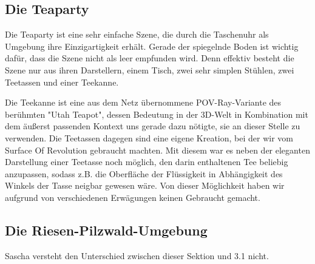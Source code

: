 \documentclass[twocolumn]{article}
\begin{document}
\subsection{Die Teaparty}
Die Teaparty ist eine sehr einfache Szene, die durch die Taschenuhr als Umgebung ihre Einzigartigkeit erhält.
Gerade der spiegelnde Boden ist wichtig dafür, dass die Szene nicht als leer empfunden wird.
Denn effektiv besteht die Szene nur aus ihren Darstellern, einem Tisch, zwei sehr simplen Stühlen, zwei Teetassen und einer Teekanne.

Die Teekanne ist eine aus dem Netz übernommene POV-Ray-Variante des berühmten "Utah Teapot", dessen Bedeutung in der 3D-Welt in Kombination mit dem äußerst passenden Kontext uns gerade dazu nötigte, sie an dieser Stelle zu verwenden.
Die Teetassen dagegen sind eine eigene Kreation, bei der wir vom Surface Of Revolution gebraucht machten. Mit diesem war es neben der eleganten Darstellung einer Teetasse noch möglich, den darin enthaltenen Tee beliebig anzupassen, sodass z.B. die Oberfläche der Flüssigkeit in Abhängigkeit des Winkels der Tasse neigbar gewesen wäre.
Von dieser Möglichkeit haben wir aufgrund von verschiedenen Erwägungen keinen Gebraucht gemacht.

\subsection{Die Riesen-Pilzwald-Umgebung}
Sascha versteht den Unterschied zwischen dieser Sektion und 3.1 nicht.
\end{document}
